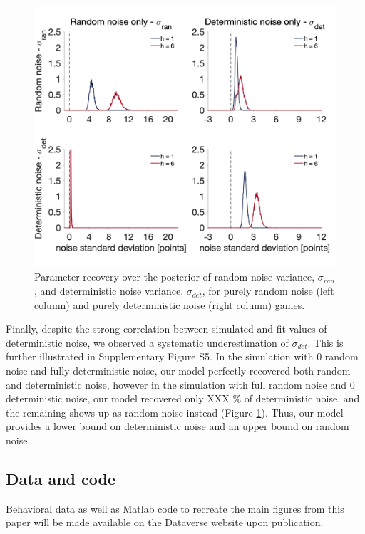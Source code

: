 \documentclass[12pt]{article}
\begin{document}
	\begin{figure}[hp]
		\begin{center}
			\includegraphics[width=1\textwidth]{figures/RanDetNoise_pure_ran_det_simu_hyperprior.png}
			\caption{Parameter recovery over the posterior of random noise variance, $\sigma_{ran}$, and deterministic noise variance, $\sigma_{det}$, for purely random noise (left column) and purely deterministic noise (right column) games. 
			}
			\label{fig:pararecover2}
		\end{center}
	\end{figure} 
	

	Finally, despite the strong correlation between simulated and fit values of deterministic noise, we observed a systematic underestimation of $\sigma_{det}$. This is further illustrated in Supplementary Figure S5. In the simulation with 0 random noise and fully deterministic noise, our model perfectly recovered both random and deterministic noise, however in the simulation with full random noise and 0 deterministic noise, our model recovered only XXX \% of deterministic noise, and the remaining shows up as random noise instead (Figure \ref{fig:pararecover2}). Thus, our model provides a lower bound on deterministic noise and an upper bound on random noise.
	
	
	\subsection*{Data and code}
	Behavioral data as well as Matlab code to recreate the main figures from this paper will be made available on the Dataverse website upon publication. %
	
\end{document}
